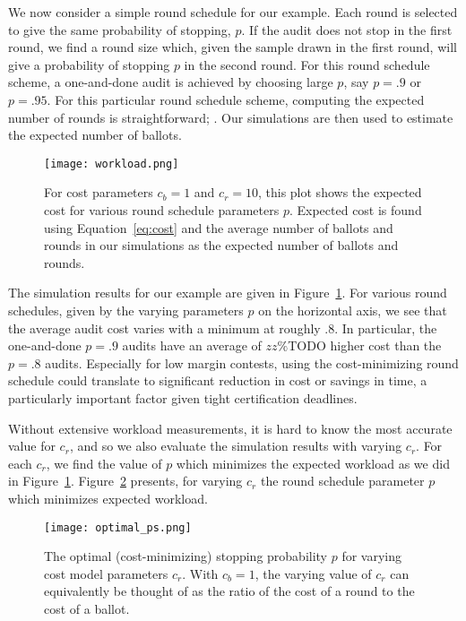 We now consider a simple round schedule for our example. Each round is selected to give the same probability of stopping, $p$. If the audit does not stop in the first round, we find a round size which, given the sample drawn in the first round, will give a probability of stopping $p$ in the second round. For this round schedule scheme, a one-and-done audit is achieved by choosing large $p$, say $p=.9$ or $p=.95$. For this particular round schedule scheme, computing the expected number of rounds is straightforward; . Our simulations are then used to estimate the expected number of ballots.

\begin{figure}
\texttt{[image: workload.png]}
\caption{For cost parameters $c_b=1$ and $c_r=10$, this plot shows the expected cost for various round schedule parameters $p$. Expected cost is found using Equation~\ref{eq:cost} and the average number of ballots and rounds in our simulations as the expected number of ballots and rounds.}
\label{fig:workload}
\end{figure}

The simulation results for our example are given in Figure~\ref{fig:workload}. 
For various round schedules, given by the varying parameters $p$ on the horizontal axis, we see that the average audit cost varies with a minimum at roughly $.8$. In particular, the one-and-done $p=.9$ audits have an average of $zz\%$TODO higher cost than the $p=.8$ audits. Especially for low margin contests, using the cost-minimizing round schedule could translate to significant reduction in cost or savings in time, a particularly important factor given tight certification deadlines.

Without extensive workload measurements, it is hard to know the most accurate value for $c_r$, and so we also evaluate the simulation results with varying $c_r$. 
For each $c_r$, we find the value of $p$ which minimizes the expected workload as we did in Figure~\ref{fig:workload}. Figure~\ref{fig:optimal_ps} presents, for varying $c_r$ the round schedule parameter $p$ which minimizes expected workload. 

\begin{figure}
\texttt{[image: optimal\_ps.png]}
\caption{The optimal (cost-minimizing) stopping probability $p$ for varying cost model parameters $c_r$. With $c_b=1$, the varying value of $c_r$ can equivalently be thought of as the ratio of the cost of a round to the cost of a ballot.}
\label{fig:optimal_ps}
\end{figure}







